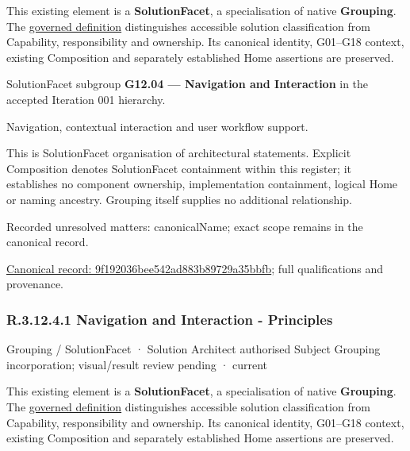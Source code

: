 This existing element is a \textbf{SolutionFacet}, a specialisation of native
\textbf{Grouping}. The \href{\detokenize{../../../../../../../governance/continuum-representation.md#solutionfacet-classification--1119-candidate}}{governed definition}
distinguishes accessible solution classification from Capability, responsibility
and ownership. Its canonical identity, G01–G18 context, existing Composition
and separately established Home assertions are preserved.



SolutionFacet subgroup \textbf{G12.04 — Navigation and Interaction} in the accepted Iteration 001 hierarchy.



Navigation, contextual interaction and user workflow support.



This is SolutionFacet organisation of architectural statements. Explicit Composition denotes SolutionFacet containment within this register; it establishes no component ownership, implementation containment, logical Home or naming ancestry. Grouping itself supplies no additional relationship.


{\small Recorded unresolved matters: canonicalName; exact scope remains in the canonical record.}\par
{\footnotesize \href{../../../../../../../continuum/grouping/9f192036bee542ad883b89729a35bbfb.md}{Canonical record: 9f192036bee542ad883b89729a35bbfb}; full qualifications and provenance.}\par
\subsubsection*{R.3.12.4.1 Navigation and Interaction - Principles}
\label{navigation:R.3.12.4.1}

\label{element:5120fbb391e24b3f941d8a5cc347a1fd}
{\small Grouping / SolutionFacet · Solution Architect authorised Subject Grouping incorporation; visual/result review pending · current}\par

This existing element is a \textbf{SolutionFacet}, a specialisation of native
\textbf{Grouping}. The \href{\detokenize{../../../../../../../governance/continuum-representation.md#solutionfacet-classification--1119-candidate}}{governed definition}
distinguishes accessible solution classification from Capability, responsibility
and ownership. Its canonical identity, G01–G18 context, existing Composition
and separately established Home assertions are preserved.



